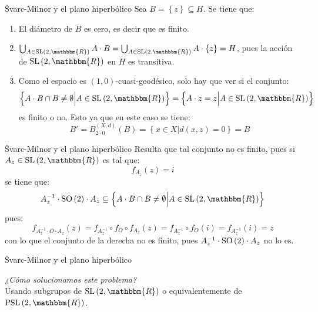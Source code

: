 \documentclass[xcolor=dvipsnames]{beamer}
\theoremstyle{largebreak}
\newcommand{\bbm}[1]{\ensuremath{\mathbbm{#1}}}
\newcommand{\SO}[1]{\ensuremath{\textup{SO}\left(#1\right)}}
\newcommand{\SL}[1]{\ensuremath{\textup{SL}\left(#1\right)}}
\newcommand{\PSL}[1]{\ensuremath{\textup{PSL}\left(#1\right)}}
\begin{document}
\begin{frame}{Švarc-Milnor y el plano hiperbólico}
    Sea $B=\left\{z\right\}\subseteq H$. Se tiene que:
    \begin{enumerate}[label = \textit{(\arabic*)}]
        \item El diámetro de $B$ es cero, es decir que es finito.
        \item $\bigcup_{A\in\SL{2,\bbm{R}}}A\cdot B=\bigcup_{A\in\SL{2,\bbm{R}}}A\cdot\left\{z\right\}=H$, pues la acción de $\SL{2,\bbm{R}}$ en $H$ es transitiva.
        \item Como el espacio es $(1,0)$-cuasi-geodésico, solo hay que ver si el conjunto:
        \begin{equation*}
            \left\{A\cdot B\cap B\neq\emptyset \Big|A\in\SL{2,\bbm{R}} \right\}=\left\{A\cdot z=z\Big|A\in\SL{2,\bbm{R}} \right\}
        \end{equation*}
        es finito o no. Esto ya que en este caso se tiene:
        \begin{equation*}
            B'=B_{2\cdot 0}^{(X,d)}(B)=\left\{x\in X\Big|d(x,z)=0\right\}=B
        \end{equation*}
    \end{enumerate}
\end{frame}

\begin{frame}{Švarc-Milnor y el plano hiperbólico}
    Resulta que tal conjunto no es finito, pues si $A_z\in\SL{2,\bbm{R}}$ es tal que:
    \begin{equation*}
        f_{A_z}(z)=i
    \end{equation*}
    se tiene que:
    \begin{equation*}
        A_z^{-1}\cdot\SO{2}\cdot A_z\subseteq\left\{A\cdot B\cap B\neq\emptyset \Big|A\in\SL{2,\bbm{R}} \right\}
    \end{equation*}
    pues:
    \begin{equation*}
        f_{A_z^{-1}\cdot O\cdot A_z}(z)=f_{A_z^{-1}}\circ f_{O}\circ f_{A_z}(z)=f_{A_z^{-1}}\circ f_{O}(i)=f_{A_z^{-1}}(i)=z
    \end{equation*}
    con lo que el conjunto de la derecha no es finito, pues $A_z^{-1}\cdot\SO{2}\cdot A_z$ no lo es.
\end{frame}

\begin{frame}{Švarc-Milnor y el plano hiperbólico}
    \begin{center}
        \Large \textit{¿Cómo solucionamos este problema?}\\
        \pause
        \Large Usando subgrupos de $\SL{2,\bbm{R}}$ o equivalentemente de $\PSL{2,\bbm{R}}$.
    \end{center}
\end{frame}
\end{document}
